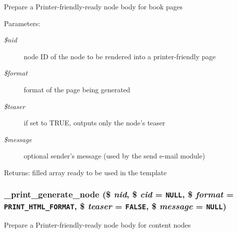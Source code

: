 Prepare a Printer-friendly-ready node body for book pages

\begin{Desc}
\item[Parameters:]
\begin{description}
\item[{\em \$nid}]node ID of the node to be rendered into a printer-friendly page \item[{\em \$format}]format of the page being generated \item[{\em \$teaser}]if set to TRUE, outputs only the node's teaser \item[{\em \$message}]optional sender's message (used by the send e-mail module) \end{description}
\end{Desc}
\begin{Desc}
\item[Returns:]filled array ready to be used in the template \end{Desc}
\hypertarget{print_8pages_8inc_c1145058f38f60736aadfe1b67ad9e12}{
\subsubsection[{\_\-print\_\-generate\_\-node}]{\setlength{\rightskip}{0pt plus 5cm}\_\-print\_\-generate\_\-node (\$ {\em nid}, \/  \$ {\em cid} = {\tt NULL}, \/  \$ {\em format} = {\tt PRINT\_\-HTML\_\-FORMAT}, \/  \$ {\em teaser} = {\tt FALSE}, \/  \$ {\em message} = {\tt NULL})}}
\label{print_8pages_8inc_c1145058f38f60736aadfe1b67ad9e12}


Prepare a Printer-friendly-ready node body for content nodes

